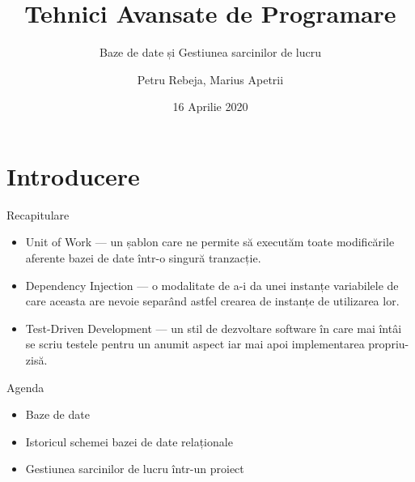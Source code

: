 \documentclass[presentation]{beamer}
\author{Petru Rebeja, Marius Apetrii}
\date{16 Aprilie 2020}
\title{Tehnici Avansate de Programare}
\subtitle{Baze de date și Gestiunea sarcinilor de lucru}
\institute[UAIC]{Facultatea de Matematică\\Universitatea Alexandru Ioan Cuza, Iași}
\begin{document}
\maketitle
\section{Introducere}
\label{sec:orga8173ff}
\begin{frame}[label={sec:orgbed4e3d}]{Recapitulare}
\begin{itemize}
\item \alert{Unit of Work} --- un șablon care ne permite să executăm toate modificările aferente bazei de date într-o singură tranzacție.
\item \alert{Dependency Injection} --- o modalitate de a-i da unei instanțe variabilele de care aceasta are nevoie separând astfel crearea de instanțe de utilizarea lor.
\item \alert{Test-Driven Development} --- un stil de dezvoltare software în care mai întâi se scriu testele pentru un anumit aspect iar mai apoi implementarea propriu-zisă.
\end{itemize}
\end{frame}
\begin{frame}[label={sec:orgd187ecf}]{Agenda}
\begin{itemize}
\item Baze de date
\item Istoricul schemei bazei de date relaționale
\item Gestiunea sarcinilor de lucru într-un proiect
\end{itemize}
\end{frame}
\end{document}
